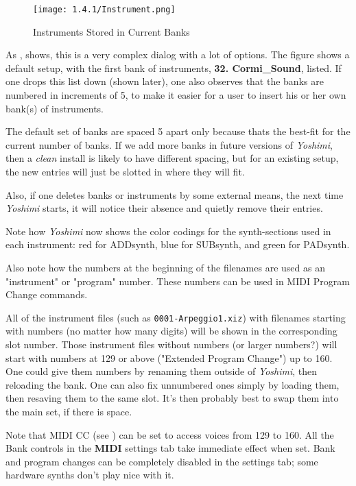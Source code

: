 \begin{figure}[H]
   \centering 
   \texttt{[image: 1.4.1/Instrument.png]}
   \caption[Show Stored Instruments]{Instruments Stored in Current Banks}
   \label{fig:instruments_show_stored}
\end{figure}

   As ,
   shows, this is a very complex dialog with a lot of options.
   The figure shows a default setup, with the first bank of instruments,
   \textbf{32. Cormi\_Sound}, listed.
   If one drops this list down (shown later), one also observes that the banks
   are numbered in increments of 5, to make it easier for a user to insert his
   or her own bank(s) of instruments.

   The default set of banks are spaced 5 apart only because thats the
   best-fit for the current number of banks.  If we add more banks in future
   versions of \textsl{Yoshimi}, then a \textsl{clean} install is likely to have
   different spacing, but for an existing setup, the new entries will just be
   slotted in where they will fit.

   Also, if one deletes banks or instruments by some external means, the next
   time \textsl{Yoshimi} starts, it will notice their absence and quietly
   remove their entries.

   Note how \textsl{Yoshimi} now shows the color codings for the
   synth-sections used in each instrument:
   red for ADDsynth, blue for SUBsynth, and green for PADsynth.

   Also note how the numbers at the beginning of the filenames are used as
   an "instrument" or "program" number.  These numbers can be used in MIDI
   Program Change commands.
   
   All of the instrument files (such as \texttt{0001-Arpeggio1.xiz})
   with filenames starting with numbers (no matter how many digits)
   will be
   shown in the corresponding slot number.  Those instrument files
   without numbers (or larger numbers?) will start
   with numbers at 129 or above ("Extended Program Change") up to 160.
   One could give them numbers by renaming them outside of \textsl{Yoshimi},
   then reloading the bank.
   One can also fix unnumbered ones simply by loading them, then resaving them
   to the same slot. It's then probably best to swap them into the main set,
   if there is space.

   Note that MIDI CC
   (see )
   can be set to access voices from 129 to 160.
   All the Bank controls in the \textbf{MIDI} settings tab take immediate
   effect when set.
   Bank and program changes can be completely disabled in the settings tab;
   some hardware synths don't play nice with it.

